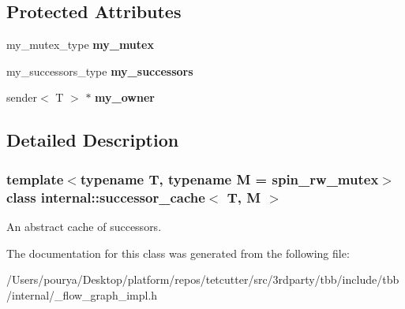 \subsection*{Protected Attributes}
\begin{DoxyCompactItemize}
\item 
\hypertarget{classinternal_1_1successor__cache_ab22e6f9a98ca50cc7a396e10341cbbbe}{}my\+\_\+mutex\+\_\+type {\bfseries my\+\_\+mutex}\label{classinternal_1_1successor__cache_ab22e6f9a98ca50cc7a396e10341cbbbe}

\item 
\hypertarget{classinternal_1_1successor__cache_a25f3f7c05554692fc45302da6a3c1a61}{}my\+\_\+successors\+\_\+type {\bfseries my\+\_\+successors}\label{classinternal_1_1successor__cache_a25f3f7c05554692fc45302da6a3c1a61}

\item 
\hypertarget{classinternal_1_1successor__cache_a8da00c2a5c270dfc7c51bfc010df8bab}{}sender$<$ T $>$ $\ast$ {\bfseries my\+\_\+owner}\label{classinternal_1_1successor__cache_a8da00c2a5c270dfc7c51bfc010df8bab}

\end{DoxyCompactItemize}


\subsection{Detailed Description}
\subsubsection*{template$<$typename T, typename M = spin\+\_\+rw\+\_\+mutex$>$class internal\+::successor\+\_\+cache$<$ T, M $>$}

An abstract cache of successors. 

The documentation for this class was generated from the following file\+:\begin{DoxyCompactItemize}
\item 
/\+Users/pourya/\+Desktop/platform/repos/tetcutter/src/3rdparty/tbb/include/tbb/internal/\+\_\+flow\+\_\+graph\+\_\+impl.\+h\end{DoxyCompactItemize}
